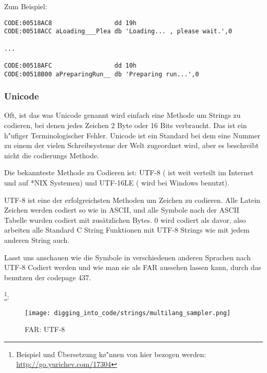 Zum Beispiel:

\begin{lstlisting}[caption=Delphi,style=customasmx86]
CODE:00518AC8                 dd 19h
CODE:00518ACC aLoading___Plea db 'Loading... , please wait.',0

...

CODE:00518AFC                 dd 10h
CODE:00518B00 aPreparingRun__ db 'Preparing run...',0
\end{lstlisting}

\subsubsection{Unicode}


Oft, ist das was Unicode genannt wird einfach eine Methode um Strings zu codieren, bei denen jedes Zeichen 2 Byte oder 
16 Bits verbraucht. Das ist ein h\a"ufiger Terminologischer Fehler. Unicode ist ein Standard bei dem eine Nummer 
zu einem der vielen Schreibsysteme der Welt zugeordnet wird, aber es beschreibt nicht die codierungs Methode. 


Die bekannteste Methode zu Codieren ist: UTF-8 ( ist weit verteilt im Internet und auf *NIX Systemen) und UTF-16LE ( wird bei Windows benutzt). 


UTF-8 ist eine der erfolgreichsten Methoden um Zeichen zu codieren.
Alle Latein Zeichen werden codiert so wie in ASCII, und alle Symbole nach der
ASCII Tabelle wurden codiert mit zus\"atzlichen Bytes. 0 wird codiert als davor,
also arbeiten alle Standard C String Funktionen mit UTF-8 Strings wie mit jedem anderen String auch.

Lasst uns anschauen wie die Symbole in verschiedenen anderen Sprachen nach UTF-8 Codiert werden und 
wie man sie als FAR aussehen lassen kann, durch das benutzen der codepage 437.

\footnote{Beispiel und \"Ubersetzung k\o"nnen von hier bezogen werden:  
\url{http://go.yurichev.com/17304}}:

\begin{figure}[H]
\centering
\texttt{[image: digging\_into\_code/strings/multilang\_sampler.png]}
\end{figure}

\begin{figure}[H]
\centering
{}
\caption{FAR: UTF-8}
\end{figure}

